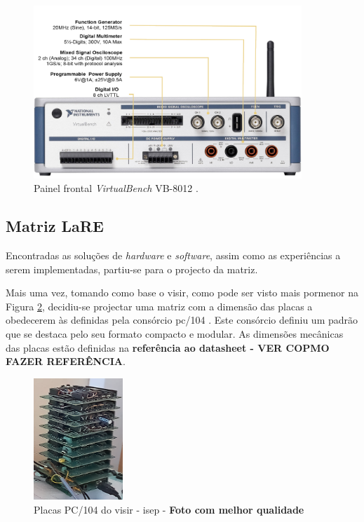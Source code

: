 \begin{figure}[hbtp]
	\centering
	\includegraphics[width=0.9\textwidth]{figures/virtualbench_front-panel.jpg}
	\caption{Painel frontal \textit{VirtualBench} VB-8012  \cite{datasheetVirtualBench}.}
	\label{fig:paineldianteiro}
\end{figure}


\subsection{Matriz LaRE}
\label{sec:matriz}
Encontradas as soluções de \textit{hardware} e \textit{software}, assim como as experiências a serem implementadas, partiu-se para o projecto da matriz.

Mais uma vez, tomando como base o \acrshort{visir}, como pode ser visto mais pormenor na Figura \ref{fig:visir104}, decidiu-se projectar uma matriz com a dimensão das placas a obedecerem às definidas pela consórcio \gls{pc/104} \cite{PC104}. Este consórcio definiu um padrão que se destaca pelo seu formato compacto e modular. As dimensões mecânicas das placas estão definidas na \textbf{referência ao datasheet - VER COPMO FAZER REFERÊNCIA}.

\begin{figure}[hbtp]
	\centering
	\includegraphics[width=0.3\textwidth]{figures/promenorvisirISEP.png}
	\caption{Placas PC/104 do \acrshort{visir} - \acrshort{isep} - \textbf{Foto com melhor qualidade}}
	\label{fig:visir104}
\end{figure}

